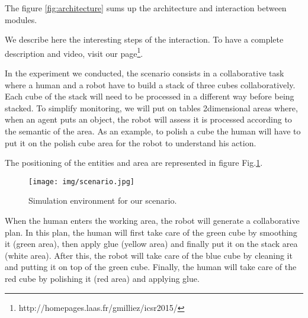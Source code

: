 \documentclass{llncs}
\begin{document}
The figure \ref{fig:architecture}
sums up the architecture and interaction between modules.


We describe here the interesting steps of the interaction. To have a complete description and video, visit our page\footnote{http://homepages.laas.fr/gmilliez/icsr2015/}.

In the experiment we conducted, the scenario consists in a collaborative task where a human and a robot have to build a stack of three cubes collaboratively. 
Each cube of the stack will need to be processed in a different way before being stacked.
To simplify monitoring, we will put on tables 2dimensional areas where, when an agent puts an object, the robot will assess it is processed according to the semantic of the area. As an example, to polish a cube the human will have to put it on the polish cube area for the robot to understand his action.

The positioning of the entities and area are represented in figure Fig.\ref{fig:scenario}.

\begin{figure}[h!]
   \vspace{-20pt}
\label{architecture}
  \centering
\texttt{[image: img/scenario.jpg]}
   \vspace{-8pt}
\caption{Simulation environment for our scenario.}
 \label{fig:scenario}
   \vspace{-30pt}
\end{figure}

When the human enters the working area, the robot will generate a collaborative plan. In this plan, the human will first take care of the green cube by smoothing it (green area), then apply glue (yellow area) and finally put it on the stack area (white area).
After this, the robot will take care of the blue cube by cleaning it and putting it on top of the green cube.
Finally, the human will take care of the red cube by polishing it (red area) and applying glue.
\end{document}
